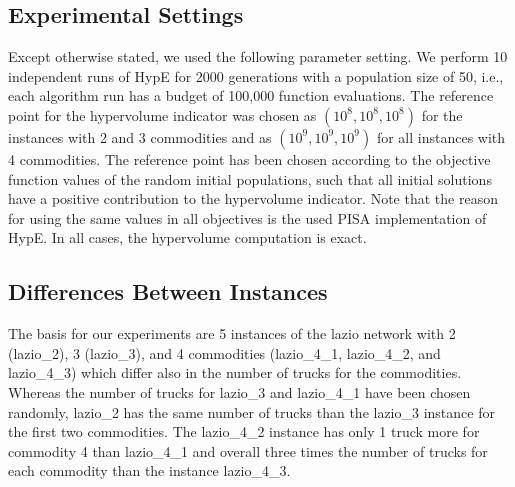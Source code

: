 \documentclass[preprint,12pt]{elsarticle}
\begin{document}

\subsection{Experimental Settings}
Except otherwise stated, we used the following parameter setting. We perform 10 independent runs of HypE for 2000 generations with a population size of 50, i.e., each algorithm run has a budget of 100,000 function evaluations. The reference point for the hypervolume indicator was chosen as $(10^8, 10^8, 10^8)$ for the instances with 2 and 3 commodities and as $(10^9, 10^9, 10^9)$ for all instances with 4 commodities. The reference point has been chosen according to the objective function values of the random initial populations, such that all initial solutions have a positive contribution to the hypervolume indicator. Note that the reason for using the same values in all objectives is the used PISA implementation of HypE. In all cases, the hypervolume computation is exact.


\subsection{Differences Between Instances}
The basis for our experiments are 5 instances of the lazio network with 2 (lazio\_2), 3 (lazio\_3), and 4 commodities (lazio\_4\_1, lazio\_4\_2, and lazio\_4\_3) which differ also in the number of trucks for the commodities. Whereas the number of trucks for lazio\_3 and lazio\_4\_1 have been chosen randomly, lazio\_2 has the same number of trucks than the lazio\_3 instance for the first two commodities. The lazio\_4\_2 instance has only 1 truck more for commodity 4 than lazio\_4\_1 and overall three times the number of trucks for each commodity than the instance lazio\_4\_3.
\end{document}
